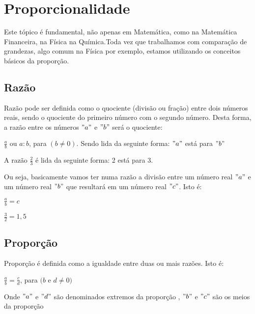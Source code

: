 \chapter{Proporcionalidade}
Este tópico é fundamental, não apenas em Matemática, como na Matemática Financeira, na Física  na Química.Toda vez que trabalhamos com comparação de grandezas, algo comum na Física por exemplo, estamos utilizando os conceitos básicos da proporção.   

\section{Razão}
Razão pode ser definida como o quociente (divisão ou fração) entre dois números reais, sendo o quociente do primeiro número com o segundo número. Desta forma, a razão entre os números $"a"$ e $"b"$ será o quociente:

	\begin{center}
		$\frac{a}{b}$ ou $a:b$, para $(b \neq 0)$. 	Sendo lida da seguinte forma: 
		$"a"$ está para $"b"$
	\end{center}

	\begin{example}
	A razão $\frac{2}{3}$ é lida da seguinte forma: 2 está para 3.
	\end{example}

\noindent Ou seja, basicamente vamos ter numa razão a divisão entre um número real $"a"$ e um número real $"b"$ que resultará em um número real $"c"$. Isto é:  

	\begin{center}
		$\frac{a}{b} = c$ 
	\end{center}
	
	\begin{example}
	   $\frac{3}{2} = 1,5$
	\end{example}

\section{Proporção}

Proporção é definida como a igualdade entre duas ou mais razões. Isto é:

	\begin{center}
	    $\frac{a}{b} = \frac{c}{d}$, para $(b$ e $d \neq 0)$
	\end{center}

Onde $"a"$ e $"d"$ são denominados extremos da proporção , $"b"$ e $"c"$ são os meios da proporção

